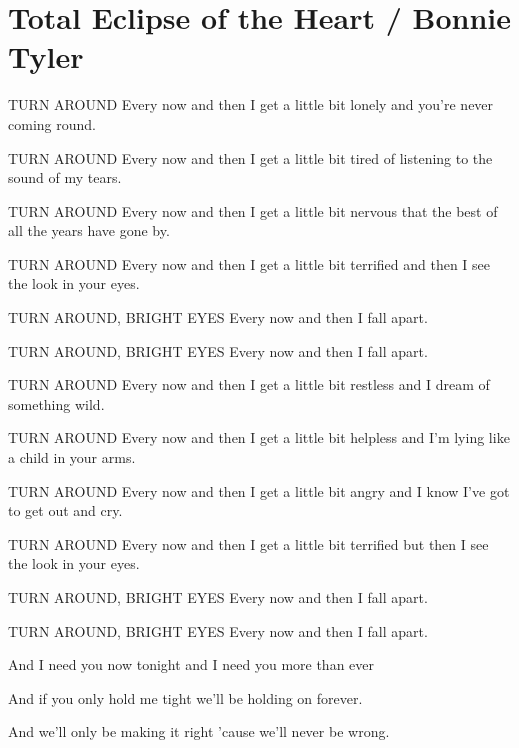 \section{Total Eclipse of the Heart / Bonnie Tyler}\label{sec:totaleclipseoftheheart}
\Bminor
\Amajor
\DmajorEasy
\Cmajor
\Fmajor
\BflatMajor
\Bmajor
\EmajorEasy
\FsharpMinor
\Fminor

TURN AROUND Every now and then I get a little bit lonely and you're never coming
round.

TURN AROUND Every now and then I get a little bit tired of listening to the sound of
my tears.

TURN AROUND Every now and then I get a little bit nervous that the best of all the
years have gone by.

TURN AROUND Every now and then I get a little bit terrified and then I see the look in
your eyes.

TURN AROUND, BRIGHT EYES Every now and then I fall apart.

TURN AROUND, BRIGHT EYES Every now and then I fall apart.

TURN AROUND Every now and then I get a little bit restless and I dream of
something wild.

TURN AROUND Every now and then I get a little bit helpless and I'm lying like
a child in your arms.

TURN AROUND Every now and then I get a little bit angry and I know I've got to
get out and cry.

TURN AROUND Every now and then I get a little bit terrified but then I see the
look in your eyes.

TURN AROUND, BRIGHT EYES Every now and then I fall apart.

TURN AROUND, BRIGHT EYES Every now and then I fall apart.

And I need you now tonight and I need you more than ever

And if you only hold me tight we'll be holding on forever.

And we'll only be making it right 'cause we'll never be wrong.


